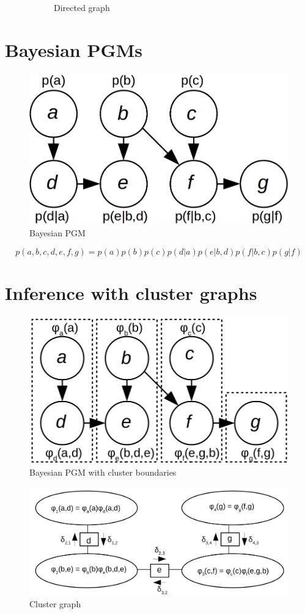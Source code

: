 \documentclass[12pt,oneside,openany,a4paper, %
afrikaans,english,
]{memoir}
\numberwithin{equation}{chapter}
\begin{document}
\begin{figure}[h!]
\begin{subfigure}[b]{0.3\linewidth}
    \caption{Directed graph}
  \end{subfigure}
  \caption{}
  \label{fig:comGraphs}
\end{figure}
\section{Bayesian PGMs}
\begin{figure}[H]
  \includegraphics[width=0.6\linewidth]{Figures/bayesian_pgm.png}
  \centering
  \caption{Bayesian PGM}
  \label{fig:bays_pgm}
\end{figure}
\begin{equation}
p(a,b,c,d,e,f,g) = p(a)p(b)p(c)p(d|a)p(e|b,d)p(f|b,c)p(g|f)
\end{equation}
\section{Inference with cluster graphs}
\begin{figure}[H]
  \includegraphics[width=0.6\linewidth]{Figures/cluster_divisions.png}
  \centering
  \caption{Bayesian PGM with cluster boundaries}
  \label{fig:e_ellipse}
\end{figure}
\begin{figure}[H]
  \includegraphics[width=\linewidth]{Figures/clustergraph.png}
  \centering
  \caption{Cluster graph}
  \label{fig:e_ellipse}
\end{figure}
\end{document}
